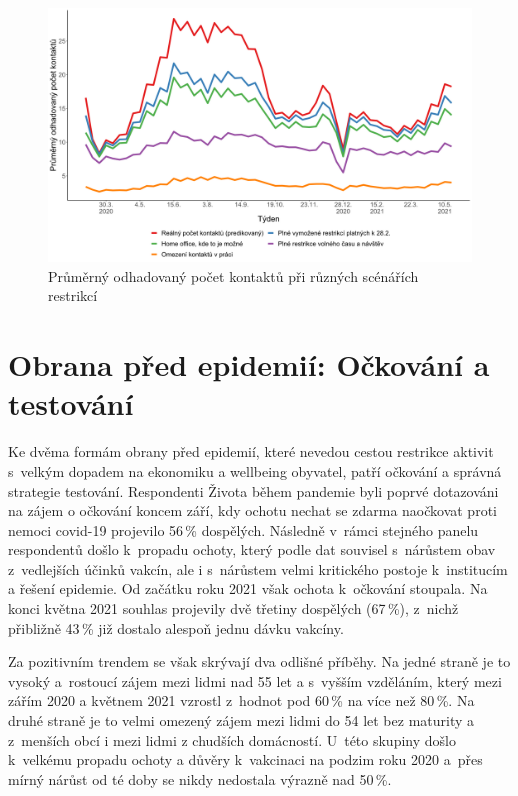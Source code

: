 \begin{figure}[ht]
    \centering
    \includegraphics[width=\textwidth]{./pic/zbp-graf5.png}
    \caption{Průměrný odhadovaný počet kontaktů při různých scénářích restrikcí}
    \label{fig:zbp5}
\end{figure}


\section*{Obrana před epidemií: Očkování a testování}

Ke dvěma formám obrany před epidemií, které nevedou cestou restrikce aktivit s velkým dopadem na ekonomiku a wellbeing obyvatel, patří očkování a správná strategie testování. Respondenti Života během pandemie byli poprvé dotazováni na zájem o očkování koncem září, kdy ochotu nechat se zdarma naočkovat proti nemoci covid-19 projevilo 56\,\% dospělých. Následně v rámci stejného panelu respondentů došlo k propadu ochoty, který podle dat souvisel s nárůstem obav z vedlejších účinků vakcín, ale i s nárůstem velmi kritického postoje k institucím a řešení epidemie. Od začátku roku 2021 však ochota k očkování stoupala. Na konci května 2021 souhlas projevily dvě třetiny dospělých (67\,\%), z nichž přibližně 43\,\% již dostalo alespoň jednu dávku vakcíny. 

Za pozitivním trendem se však skrývají dva odlišné příběhy. Na jedné straně je to vysoký a rostoucí zájem mezi lidmi nad 55 let a s vyšším vzděláním, který mezi zářím 2020 a květnem 2021 vzrostl z hodnot pod 60\,\% na více než 80\,\%. Na druhé straně je to velmi omezený zájem mezi lidmi do 54 let bez maturity a z menších obcí i mezi lidmi z chudších domácností. U této skupiny došlo k velkému propadu ochoty a důvěry k vakcinaci na podzim roku 2020 a přes mírný nárůst od té doby se nikdy nedostala výrazně nad 50\,\%. 

